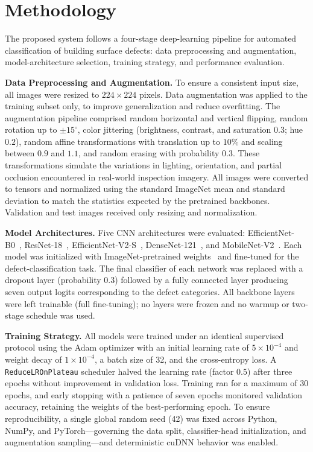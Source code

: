 \documentclass[conference]{IEEEtran}
\begin{document}
\section{Methodology}
The proposed system follows a four-stage deep-learning pipeline for automated classification of building surface defects: data preprocessing and augmentation, model-architecture selection, training strategy, and performance evaluation.

\textbf{Data Preprocessing and Augmentation.}
To ensure a consistent input size, all images were resized to $224\times224$ pixels. Data augmentation was applied to the training subset only, to improve generalization and reduce overfitting. The augmentation pipeline comprised random horizontal and vertical flipping, random rotation up to $\pm15^{\circ}$, color jittering (brightness, contrast, and saturation $0.3$; hue $0.2$), random affine transformations with translation up to $10\%$ and scaling between $0.9$ and $1.1$, and random erasing with probability $0.3$. These transformations simulate the variations in lighting, orientation, and partial occlusion encountered in real-world inspection imagery. All images were converted to tensors and normalized using the standard ImageNet mean and standard deviation to match the statistics expected by the pretrained backbones. Validation and test images received only resizing and normalization.

\textbf{Model Architectures.}
Five CNN architectures were evaluated: EfficientNet-B0~\cite{ref27}, ResNet-18~\cite{ref24}, EfficientNet-V2-S~\cite{ref28}, DenseNet-121~\cite{ref25}, and MobileNet-V2~\cite{ref26}. Each model was initialized with ImageNet-pretrained weights~\cite{ref23} and fine-tuned for the defect-classification task. The final classifier of each network was replaced with a dropout layer (probability $0.3$) followed by a fully connected layer producing seven output logits corresponding to the defect categories. All backbone layers were left trainable (full fine-tuning); no layers were frozen and no warmup or two-stage schedule was used.

\textbf{Training Strategy.}
All models were trained under an identical supervised protocol using the Adam optimizer with an initial learning rate of $5\times10^{-4}$ and weight decay of $1\times10^{-4}$, a batch size of 32, and the cross-entropy loss. A \texttt{ReduceLROnPlateau} scheduler halved the learning rate (factor $0.5$) after three epochs without improvement in validation loss. Training ran for a maximum of 30 epochs, and early stopping with a patience of seven epochs monitored validation accuracy, retaining the weights of the best-performing epoch. To ensure reproducibility, a single global random seed (42) was fixed across Python, NumPy, and PyTorch---governing the data split, classifier-head initialization, and augmentation sampling---and deterministic cuDNN behavior was enabled.
\end{document}
